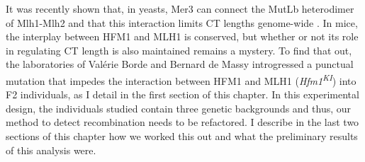 It was recently shown that, in yeasts, Mer3 can connect the MutL\textgreek{b} heterodimer of Mlh1-Mlh2 and that this interaction limits CT lengths genome-wide \citep{duroc2017concerted}.
In mice, the interplay between HFM1 and MLH1 is conserved, but whether or not its role in regulating CT length is also maintained remains a mystery.
To find that out, the laboratories of Valérie Borde and Bernard de Massy introgressed a punctual mutation that impedes the interaction between HFM1 and MLH1 (\textit{Hfm1\textsuperscript{KI}}) into F2 individuals, as I detail in the first section of this chapter.
In this experimental design, the individuals studied contain three genetic backgrounds and thus, our method to detect recombination needs to be refactored.
I describe in the last two sections of this chapter how we worked this out and what the preliminary results of this analysis were.

